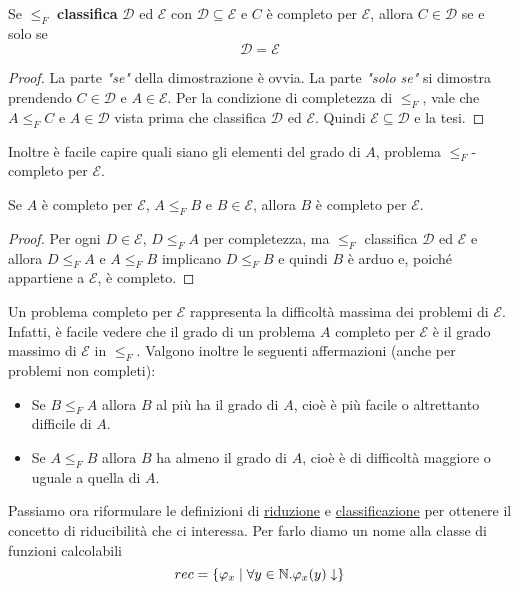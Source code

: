 \begin{property}
	Se $\leq_F$ \textbf{classifica} $\mathcal{D}$ ed $\mathcal{E}$
	con $\mathcal{D} \subseteq \mathcal{E}$ e $C$ è completo per
	$\mathcal{E}$, allora $C \in \mathcal{D}$ se e solo se
	\[ \mathcal{D} = \mathcal{E} \]
	\begin{proof}
		La parte \emph{"se"} della dimostrazione è ovvia. La
		parte \emph{"solo se"} si dimostra prendendo
		$C \in \mathcal{D}$ e $A \in \mathcal{E}$. Per
		la condizione di completezza di $\leq_F$, vale che
		$A \leq_F C$ e $A \in \mathcal{D}$ vista prima che
		classifica $\mathcal{D}$ ed $\mathcal{E}$. Quindi
		$\mathcal{E} \subseteq \mathcal{D}$ e la tesi.
	\end{proof}
\end{property}

Inoltre è facile capire quali siano gli elementi del grado di
$A$, problema $\leq_F$-completo per $\mathcal{E}$.

\begin{property}
	Se $A$ è completo per $\mathcal{E}$, $A \leq_F B$ e
	$B \in \mathcal{E}$, allora $B$ è completo per $\mathcal{E}$.
	\begin{proof}
		Per ogni $D \in \mathcal{E}$, $D \leq_F A$ per
		completezza, ma $\leq_F$ classifica $\mathcal{D}$ ed
		$\mathcal{E}$ e allora $D \leq_F A$ e $A \leq_F B$
		implicano $D \leq_F B$ e quindi $B$ è arduo e, poiché
		appartiene a $\mathcal{E}$, è completo.
	\end{proof}
\end{property}

Un problema completo per $\mathcal{E}$ rappresenta la difficoltà
massima dei problemi di $\mathcal{E}$. Infatti, è facile vedere
che il grado di un problema $A$ completo per $\mathcal{E}$ è il
grado massimo di $\mathcal{E}$ in  $\leq_F$. Valgono inoltre le
seguenti affermazioni (anche per problemi non completi):
\begin{itemize}
	\item Se $B \leq_F A$ allora $B$ al più ha il grado di $A$,
	      cioè è più facile o altrettanto difficile di $A$.
	\item Se $A \leq_F B$ allora $B$ ha almeno il grado di $A$,
	      cioè è di difficoltà maggiore o uguale a quella di $A$.
\end{itemize}

Passiamo ora riformulare le definizioni di \hyperref[def: riduzione]{riduzione}
e \hyperref[def: classificazione]{classificazione} per ottenere
il concetto di riducibilità che ci interessa. Per farlo diamo
un nome alla classe di funzioni calcolabili
\[ rec = \{ \varphi_x \mid \forall y \in \mathbb{N} . \varphi_x(y) \downarrow \} \]

